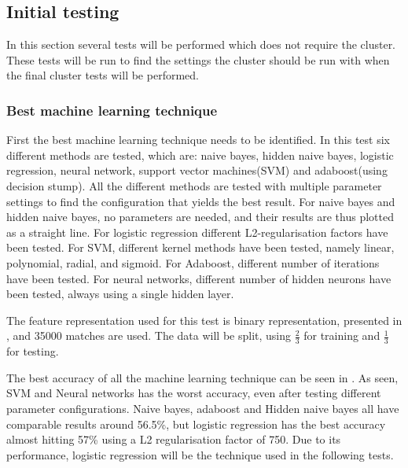 \subsection{Initial testing}\label{sec:initialtest}
In this section several tests will be performed which does not require the cluster. These tests will be run to find the settings the cluster should be run with when the final cluster tests will be performed.

\subsubsection{Best machine learning technique}
First the best machine learning technique needs to be identified. In this test six different methods are tested, which are: naive bayes, hidden naive bayes, logistic regression, neural network, support vector machines(SVM) and adaboost(using decision stump). All the different methods are tested with multiple parameter settings to find the configuration that yields the best result. For naive bayes and hidden naive bayes, no parameters are needed, and their results are thus plotted as a straight line. For logistic regression different L2-regularisation factors have been tested. For SVM, different kernel methods have been tested, namely linear, polynomial, radial, and sigmoid. For Adaboost, different number of iterations have been tested. For neural networks, different number of hidden neurons have been tested, always using a single hidden layer.

The feature representation used for this test is binary representation, presented in , and 35000 matches are used. The data will be split, using $\frac{2}{3}$ for training and $\frac{1}{3}$ for testing. 

The best accuracy of all the machine learning technique can be seen in . As seen, SVM and Neural networks has the worst accuracy, even after testing different parameter configurations. Naive bayes, adaboost and Hidden naive bayes all have comparable results around 56.5\%, but logistic regression has the best accuracy almost hitting 57\% using a L2 regularisation factor of 750. Due to its performance, logistic regression will be the technique used in the following tests.  

